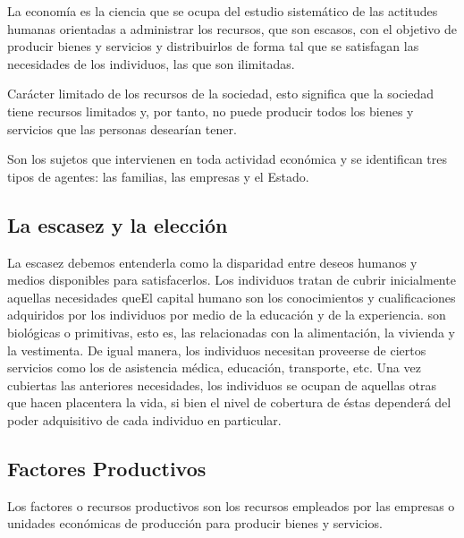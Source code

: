 \begin{definicion}[Economía]
	La economía es la ciencia que se ocupa del estudio sistemático de
	las actitudes humanas orientadas a administrar los recursos, que son
	escasos, con el objetivo de producir bienes y servicios y distribuirlos
	de forma tal que se satisfagan las necesidades de los individuos, las
	que son ilimitadas.
\end{definicion}

\begin{definicion}[Escasez]
	Carácter limitado de los recursos de la sociedad, esto significa que la sociedad tiene recursos limitados y, por tanto, no puede producir todos los bienes y servicios que las personas desearían tener.
\end{definicion}	

\begin{definicion}
	Son los sujetos que intervienen en toda actividad económica y se identifican  tres tipos de agentes: las familias, las empresas y el Estado.
\end{definicion}	




\subsection{La escasez y la elección}
La escasez debemos entenderla como la  disparidad entre deseos humanos y medios disponibles para satisfacerlos.
Los individuos tratan de cubrir inicialmente aquellas necesidades queEl capital humano son los conocimientos
y cualificaciones adquiridos por los individuos
por medio de la educación y de la experiencia. son biológicas o primitivas, esto es, las
relacionadas con la alimentación, la vivienda y la vestimenta. De igual manera, los individuos necesitan proveerse
de ciertos servicios como los de asistencia médica, educación, transporte, etc. Una vez cubiertas las anteriores necesidades, los individuos se ocupan de aquellas otras que hacen placentera la vida, si bien el nivel de cobertura de éstas dependerá del poder adquisitivo de cada individuo en particular.

\subsection{Factores Productivos}
Los factores o recursos productivos son los recursos empleados por las empresas o unidades económicas de producción para producir bienes y servicios.\\

